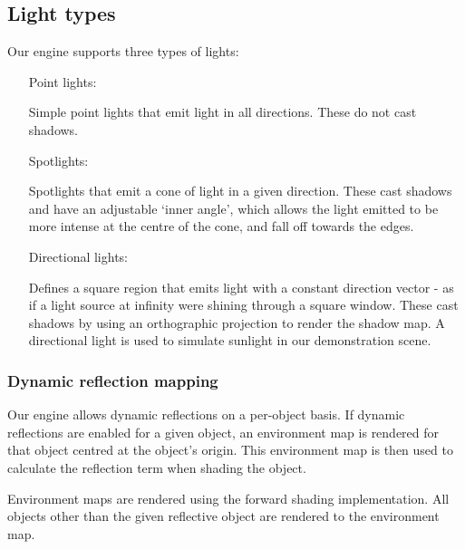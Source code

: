 \documentclass[11pt]{scrartcl} %
\begin{document}
        \subsection{Light types}

            Our engine supports three types of lights:

            \begin{itemize}

            \item[Point lights:]

                Simple point lights that emit light in all directions. These do
                not cast shadows.

            \item[Spotlights:]

                Spotlights that emit a cone of light in a given direction.
                These cast shadows and have an adjustable `inner angle', which
                allows the light emitted to be more intense at the centre of
                the cone, and fall off towards the edges.

            \item[Directional lights:]

                Defines a square region that emits light with a constant
                direction vector - as if a light source at infinity were
                shining through a square window. These cast shadows by using an
                orthographic projection to render the shadow map. A directional
                light is used to simulate sunlight in our demonstration scene.

            \end{itemize}

        \subsubsection{Dynamic reflection mapping}

            Our engine allows dynamic reflections on a per-object basis. If
            dynamic reflections are enabled for a given object, an environment
            map is rendered for that object centred at the object's origin.
            This environment map is then used to calculate the reflection term
            when shading the object.

            Environment maps are rendered using the forward shading
            implementation. All objects other than the given reflective object
            are rendered to the environment map.
\end{document}
